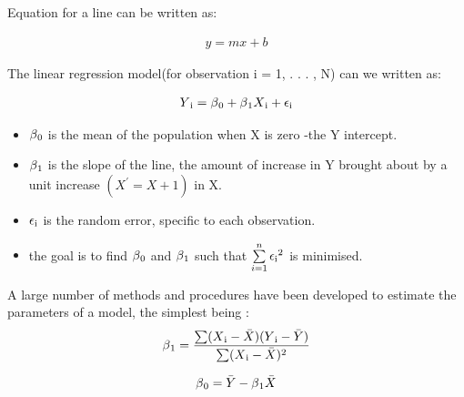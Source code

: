 {Equation for a line can be written as:

\begin{equation}
\begin{aligned}
  y= mx + b 
\label{eq:Line_equ}
\end{aligned}
\end{equation}

The linear regression model(for observation i = 1, . . . , N) can we written as:

\begin{equation}
\begin{aligned}
  Y\textsubscript{i}= \beta\textsubscript{0}+\beta\textsubscript{1}X\textsubscript{i} +\epsilon\textsubscript{i}
\label{eq:Line_equ_exp}
\end{aligned}
\end{equation}

\begin{itemize}
\item $\beta\textsubscript{0}$ is the mean of the population when X is zero -the Y intercept.
\item $\beta\textsubscript{1}$ is the slope of the line, the amount of increase in Y brought about by a unit increase $(X^{'}= X + 1)$ in X.
\item \textbf{$\epsilon\textsubscript{i}$} is the random error, specific to each observation.
\item the goal is to find $\beta\textsubscript{0}$ and $\beta\textsubscript{1}$ such that $\sum\limits_{i=1}^n \epsilon\textsubscript{i}^2$ is minimised.
\end {itemize}
A large number of methods and procedures have been developed to estimate the parameters of a model, the simplest being :\\

\begin{equation}
	\begin{aligned}
		\beta\textsubscript{1}= \dfrac{\sum (X\textsubscript{i} - \bar{X})(Y\textsubscript{i} - \bar{Y})}{\sum (X\textsubscript{i} - \bar{X})^2} 
	\label{eq:B1_calculus}
	\end{aligned}
\end{equation}

\begin{equation}
	\begin{aligned}
		\beta\textsubscript{0}= \bar{Y}-\beta\textsubscript{1}\bar{X} 
	\label{eq:B0_calculus}
	\end{aligned}
\end{equation}

}
